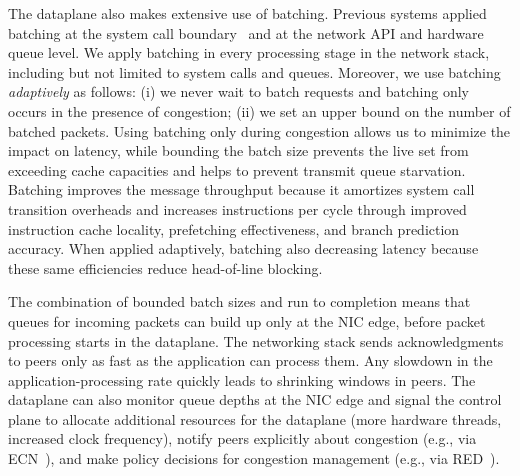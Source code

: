 The \ix dataplane also makes extensive use of batching.  Previous
systems applied batching at the system call
boundary~\cite{DBLP:conf/osdi/HanMCR12, DBLP:conf/osdi/SoaresS10} and
at the network API and hardware queue level\cite{jeong2014mtcp}.  We
apply batching in every processing stage in the network stack,
including but not limited to system calls and queues. Moreover, we use
batching \emph{adaptively} as follows: (i) we never wait to batch
requests and batching only occurs in the presence of congestion; (ii)
we set an upper bound on the number of batched packets. Using batching
only during congestion allows us to minimize the impact on latency,
while bounding the batch size prevents the live set from exceeding
cache capacities and helps to prevent transmit queue
starvation. Batching improves the message throughput because it
amortizes system call transition overheads %
and increases instructions per
cycle through improved instruction cache locality, prefetching
effectiveness, and branch prediction accuracy. When applied
adaptively, batching also decreasing latency because these same
efficiencies reduce head-of-line blocking.

The combination of bounded batch sizes and run to completion means
that queues for incoming packets can build up only at the NIC edge,
before packet processing starts in the dataplane. 
The networking stack sends acknowledgments to peers only as fast as
the application can process them. Any slowdown in the
application-processing rate quickly leads to shrinking windows in
peers. The dataplane can also monitor queue depths at the NIC edge and
signal the control plane to allocate additional resources for the
dataplane (more hardware threads, increased clock frequency), notify
peers explicitly about congestion (e.g., via
ECN~\cite{ramakrishnan2001addition}), and make policy decisions for
congestion management (e.g., via
RED~\cite{DBLP:journals/ton/FloydJ93}).



